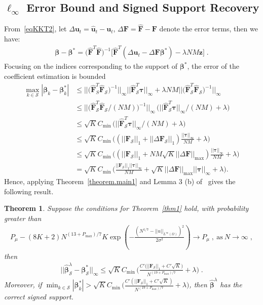 \documentclass[a4paper,11pt]{article}
\newcommand{\btau}{\bm{\tau}}
\newcommand{\bbeta}{\bm{\beta}}
\newcommand{\bF}{\mathbf{F}}
\newcommand{\mS}{\mathcal{S}}
\newcommand{\bu}{\mathbf{u}}
\newtheorem{thm}{Theorem}[section]
\theoremstyle{definition}
\begin{document}
\subsection{$\ell_\infty$ Error Bound and Signed Support Recovery}
From~\eqref{eqKKT2}, let $\Delta \bu_t=\widehat{\bu}_t-\bu_t$, $\Delta \bF=\widehat{\bF}-\bF$ denote the error terms, then we  have:
\begin{align*}
\bbeta-\bbeta^*=\Big(\widehat{\bF}^T\widehat{\bF}\Big)^{-1}	\Big[\widehat{\bF}^T(\Delta \bu_t-\Delta \bF\bbeta^*)-\lambda NM \mathbf{z}\Big]\;.
\end{align*}
Focusing on the indices corresponding to the support of $\bbeta^*$, the error of the coefficient estimation is bounded
\begin{align*}
\max_{k\in \mS}|\bbeta_k-\bbeta^*_k|&\leq	||\Big(\widehat{\bF}_S^T\widehat{\bF}_\mS\Big)^{-1}||_\infty||\widehat{\bF}_\mS^T\btau||_\infty+\lambda NM||\Big(\widehat{\bF}_\mS^T\widehat{\bF}_\mS\Big)^{-1}||_\infty\\
&\leq ||\Big(\widehat{\bF}_\mS^T\widehat{\bF}_\mS/(NM)\Big)^{-1}||_\infty\,\big(||\widehat{\bF}_\mS^T\btau||_\infty/(NM)+\lambda\big)\\
&\leq \sqrt{K}C_{\min}\,\big(||\widehat{\bF}_\mS^T\btau||_\infty/(NM)+\lambda\big)\\
&\leq \sqrt{K}C_{\min}\,\Big((||\bF_\mS||_1+||\Delta \bF_\mS||_1)\frac{||\btau||_\infty}{NM}+\lambda\Big)\\
&\leq \sqrt{K}C_{\min}\,\Big((||\bF_\mS||_1+NM\sqrt{K}||\Delta \bF||_{\max})\frac{||\btau||_\infty}{NM}+\lambda\Big)\\
&=\sqrt{K}C_{\min}\,\Big(\frac{||\bF_\mS||_1||\btau||_\infty}{NM}+\sqrt{K}||\Delta \bF||_{\max}||\btau||_\infty+\lambda\Big).
\end{align*}
Hence, applying Theorem~\ref{theorem.main1} and Lemma 3 (b) of~\cite{wainwright2009sharp} gives the following result.
\begin{thm}\label{inftythm}
Suppose the conditions for Theorem~\ref{thm1} hold,  with probability greater than
\begin{align*}
	P_\mu-(8K+2)N^{(13+P_{\max})/7}K\exp(-\frac{(N^{1/7}-||u||_{L^\infty(\Omega)})^2}{2\sigma^2})\longrightarrow P_\mu\;,~\text{as}~N\to\infty\;,
\end{align*}
then
\begin{align}
||\widehat{\bbeta}_\mS^\lambda-\bbeta_\mS^*||_\infty\leq \sqrt{K}C_{\min}\,\Big(\frac{C'\big(||\bF_\mS||_1+C'\sqrt{K}\big)}{N^{(19+P_{\max})/7}}+\lambda\Big)\;.\label{infbound}
\end{align}
Moreover, if $\min_{k\in \mS}|\bbeta_k^*|>\sqrt{K}C_{\min}\,\Big(\frac{C'(||\bF_\mS||_1+C'\sqrt{K})}{N^{(19+P_{\max})/7}}+\lambda\Big)$, then $\widehat{\bbeta}^\lambda$ has the correct signed support.
\end{thm}
\end{document}
